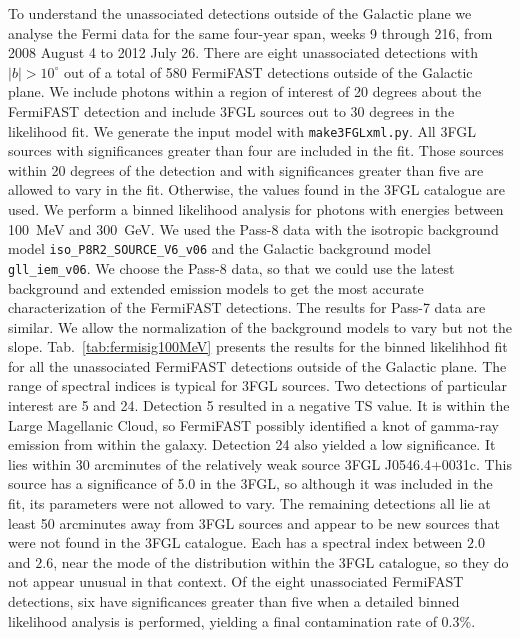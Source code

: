 \documentclass[useAMS,usenatbib]{mn2e}
\begin{document}
To understand the unassociated detections outside of the Galactic
plane we analyse the Fermi data for the same four-year span, weeks 9
through 216, from 2008 August 4 to 2012 July 26. There are eight
unassociated detections with $|b|>10^{\circ}$ out of a total of 580
FermiFAST detections outside of the Galactic plane.  We include
photons within a region of interest of 20 degrees about the FermiFAST
detection and include 3FGL sources out to 30 degrees in the likelihood
fit. We generate the input model with \texttt{make3FGLxml.py}.  All
3FGL sources with significances greater than four are included in the
fit.  Those sources within 20 degrees of the detection and with
significances greater than five are allowed to vary in the fit.
Otherwise, the values found in the 3FGL catalogue are used.  We
perform a binned likelihood analysis for photons with energies between
100~MeV and 300~GeV.  We used the Pass-8 data with the isotropic
background model \texttt{iso\_P8R2\_SOURCE\_V6\_v06} and the Galactic
background model \texttt{gll\_iem\_v06}.  We choose the Pass-8 data,
so that we could use the latest background and extended emission
models to get the most accurate characterization of the FermiFAST
detections.  The results for Pass-7 data are similar. We allow the
normalization of the background models to vary but not the slope.
Tab.~\ref{tab:fermisig100MeV} presents the results for the binned
likelihhod fit for all the unassociated FermiFAST detections outside
of the Galactic plane.  The range of spectral indices is typical for
3FGL sources.  Two detections of particular interest are 5 and 24.
Detection 5 resulted in a negative TS value.  It is within the Large
Magellanic Cloud, so FermiFAST possibly identified a knot of gamma-ray
emission from within the galaxy.  Detection 24 also yielded a low
significance.  It lies within 30 arcminutes of the relatively weak
source 3FGL J0546.4+0031c.  This source has a significance of 5.0 in
the 3FGL, so although it was included in the fit, its parameters were
not allowed to vary.  The remaining detections all lie at least 50
arcminutes away from 3FGL sources and appear to be new sources that
were not found in the 3FGL catalogue. Each has a spectral index
between $2.0$ and $2.6$, near the mode of the distribution within the
3FGL catalogue, so they do not appear unusual in that context.  Of the
eight unassociated FermiFAST detections, six have significances
greater than five when a detailed binned likelihood analysis is
performed, yielding a final contamination rate of 0.3\%.
\end{document}
